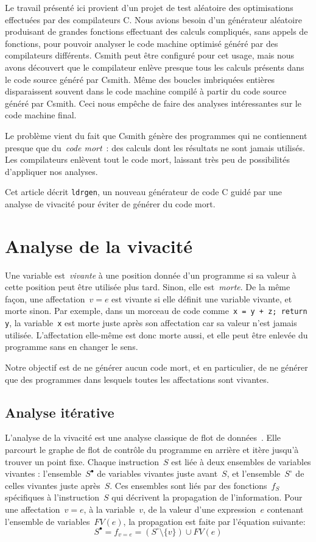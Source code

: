 \documentclass[a4paper]{easychair}
\newcommand\ldrgen{\texttt{ldrgen}}
\newcommand{\liveout}[1]{\ensuremath{#1^{\circ}}}
\newcommand{\livein}[1]{\ensuremath{#1^{\bullet}}}
\def\union{\cup}
\begin{document}
Le travail présenté ici provient d'un projet de test aléatoire des optimisations effectuées par des compilateurs C.
Nous avions besoin d'un générateur aléatoire produisant de grandes fonctions effectuant des calculs compliqués, sans appels
de fonctions, pour pouvoir analyser le code machine optimisé généré par des
compilateurs différents. Csmith peut être configuré pour cet usage, mais
nous avons découvert que le compilateur enlève presque tous les calculs
présents dans le code source généré par Csmith. Même des boucles imbriquées entières
disparaissent souvent dans le code machine compilé à partir du code source
généré par Csmith. Ceci nous empêche de faire des analyses intéressantes sur
le code machine final.

Le problème vient du fait que Csmith génère des programmes qui ne contiennent
presque que du~\emph{code mort}~: des calculs dont les résultats ne sont
jamais utilisés. Les compilateurs enlèvent tout le code mort, laissant très
peu de possibilités d'appliquer nos analyses.

Cet article décrit \ldrgen, un nouveau générateur de code C guidé par une
analyse de vivacité pour éviter de générer du code mort.


\section{Analyse de la vivacité}

Une variable est~\emph{vivante} à une position donnée d'un programme si sa
valeur à cette position peut être utilisée plus tard.
Sinon, elle est~\emph{morte}. De la
même façon, une affectation~\(v = e\) est vivante si elle définit une
variable vivante, et morte sinon. Par exemple, dans un morceau de code
comme~\texttt{x = y + z; return y}, la variable~\texttt{x} est morte juste
après son affectation car sa valeur n'est jamais utilisée. L'affectation
elle-même est donc morte aussi, et elle peut être enlevée du programme sans
en changer le sens.

Notre objectif est de ne générer aucun code mort, et en particulier, de ne
générer que des programmes dans lesquels toutes les affectations sont
vivantes.

\subsection{Analyse itérative}

L'analyse de la vivacité est une analyse classique de flot de
données~\cite{nielson.etal-1999}. Elle parcourt le graphe de flot de
contrôle du programme en arrière et itère jusqu'à trouver un point fixe.
Chaque instruction~\(S\) est liée à deux ensembles de variables vivantes :
l'ensemble~\(\livein{S}\) de variables vivantes juste avant~\(S\), et
l'ensemble~\(\liveout{S}\) de celles vivantes juste après~\(S\).
Ces ensembles sont liés par des fonctions~\(f_S\) spécifiques à
l'instruction~\(S\) qui décrivent la propagation de l'information. Pour une
affectation~\(v = e\), à la variable~\(v\), de la valeur d'une expression~\(e\) contenant
l'ensemble de variables~\(FV(e)\), la propagation est
faite par l'équation suivante:
\[
\livein{S} = f_{v = e}= (\liveout{S} \setminus \{v\}) \union FV(e)
\]
\end{document}
